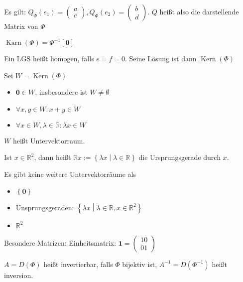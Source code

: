 \begin{remark}
  Es gilt: $Q_{\Phi}(e_1) =
  \begin{pmatrix}
    a\\c
  \end{pmatrix}
  , Q_{\Phi}(e_2) =
  \begin{pmatrix}
    b\\d
  \end{pmatrix}
  $.
  $Q$ heißt also die darstellende Matrix von $\Phi$
\end{remark}

\begin{definition}
  $\operatorname{Karn}(\Phi) = \Phi^{-1}[\mathbf{0}]$

  Ein LGS heißt homogen, falls $e = f = 0$. Seine Lösung ist dann $\operatorname{Kern}(\Phi)$
\end{definition}
\begin{proposition}
  Sei $W = \operatorname{Kern}(\Phi)$
  \begin{itemize}
  \item $\mathbf{0} \in W$, insbesondere ist $W \ne \emptyset$
  \item $\forall x, y \in W: x+y \in W$
  \item $\forall x \in W, \lambda \in \mathbb{R}: \lambda x \in W$
  \end{itemize}
  $W$ heißt Untervektorraum.
\end{proposition}
\begin{definition}[Ursprungsgerade]
  Ist $x \in \mathbb{R}^2$, dann heißt $\mathbb{R}x := \left\{ \lambda x \middle| \lambda \in \mathbb{R} \right\}$ die Ursprungsgerade durch $x$.
\end{definition}
\begin{theorem}
  Es gibt keine weitere Untervektorräume als
  \begin{itemize}
  \item $\left\{ \mathbf{0} \right\}$
  \item Unsprungsgeraden: $\left\{ \lambda x \middle| \lambda \in \mathbb{R}, x \in \mathbb{R}^2 \right\}$
  \item $\mathbb{R}^2$
  \end{itemize}
\end{theorem}


\begin{remark}
  Besondere Matrizen:
  Einheitsmatrix: $\mathbf{1} =
    \begin{pmatrix}
      1 0 \\ 0 1
    \end{pmatrix}$
\end{remark}
\begin{definition}
  $A = D(\Phi)$ heißt invertierbar, falls $\Phi$ bijektiv ist, $A^{-1} = D(\Phi^{-1})$ heißt inversion.
\end{definition}

